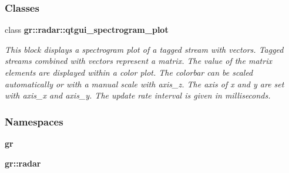\subsubsection*{Classes}
\begin{DoxyCompactItemize}
\item 
class {\bf gr\+::radar\+::qtgui\+\_\+spectrogram\+\_\+plot}
\begin{DoxyCompactList}\small\item\em This block displays a spectrogram plot of a tagged stream with vectors. Tagged streams combined with vectors represent a matrix. The value of the matrix elements are displayed within a color plot. The colorbar can be scaled automatically or with a manual scale with axis\+\_\+z. The axis of x and y are set with axis\+\_\+x and axis\+\_\+y. The update rate interval is given in milliseconds. \end{DoxyCompactList}\end{DoxyCompactItemize}
\subsubsection*{Namespaces}
\begin{DoxyCompactItemize}
\item 
 {\bf gr}
\item 
 {\bf gr\+::radar}
\end{DoxyCompactItemize}

